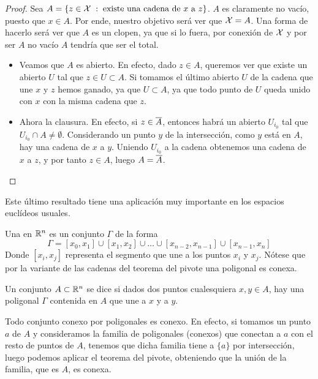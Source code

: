 \begin{proof}
	Sea $A=\{z\in\mathcal{X} \;:\; \text{existe una cadena de } x \text{ a } z \}$. $A$ es claramente no vacío, puesto que $x\in A$. Por ende, nuestro objetivo será ver que $\mathcal{X}=A$. Una forma de hacerlo será ver que $A$ es un clopen, ya que si lo fuera, por conexión de $\mathcal{X}$ y por ser $A$ no vacío $A$ tendría que ser el total.
	\begin{itemize}
		\item Veamos que $A$ es abierto. En efecto, dado $z\in A$, queremos ver que existe un abierto $U$ tal que $z\in U\subset A$. Si tomamos el último abierto $U$ de la cadena que une $x$ y $z$ hemos ganado, ya que $U\subset A$, ya que todo punto de $U$ queda unido con $x$ con la misma cadena que $z$.
		
		\item Ahora la clausura. En efecto, si $z\in\overline{A}$, entonces habrá un abierto $U_{i_0}$ tal que $U_{i_0}\cap A\not=\emptyset$. Considerando un punto $y$ de la intersección, como $y$ está en $A$, hay una cadena de $x$ a $y$. Uniendo $U_{i_0}$ a la cadena obtenemos una cadena de $x$ a $z$, y por tanto $z\in A$, luego $A=\overline{A}$. \qedhere
	\end{itemize}
\end{proof}
Este último resultado tiene una aplicación muy importante en los espacios euclídeos usuales.
\begin{defi}[Poligonal]
	Una  en $\mathbb{R}^n$ es un conjunto $\Gamma$ de la forma\begin{equation*}
		\Gamma=[x_0,x_1]\cup[x_1,x_2]\cup\dots\cup[x_{n-2},x_{n-1}]\cup[x_{n-1},x_n]
	\end{equation*}
	Donde $[x_i,x_j]$ representa el segmento que une a los puntos $x_i$ y $x_j$. Nótese que por la variante de las cadenas del teorema del pivote una poligonal es conexa.
\end{defi}
\begin{defi}
	Un conjunto $A\subset\mathbb{R}^n$ se dice  si dados dos puntos cualesquiera $x,y\in A$, hay una poligonal $\Gamma$ contenida en $A$ que une a $x$ y a $y$.
\end{defi}
\begin{obs}
	Todo conjunto conexo por poligonales es conexo. En efecto, si tomamos un punto $a$ de $A$ y consideramos la familia de poligonales (conexos) que conectan a $a$ con el resto de puntos de $A$, tenemos que dicha familia tiene a $\{a\}$ por intersección, luego podemos aplicar el teorema del pivote, obteniendo que la unión de la familia, que es $A$, es conexa.
\end{obs}
